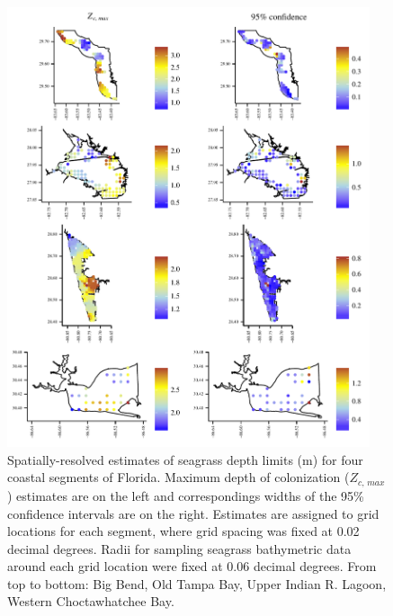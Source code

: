 \documentclass[letterpaper,12pt,oneside]{article}\usepackage[]{graphicx}\usepackage[]{color}
\begin{document}
\begin{figure}
\centering
\includegraphics[width = 0.95\textwidth]{figs/all_ests.pdf}
\caption{Spatially-resolved estimates of seagrass depth limits (m) for four coastal segments of Florida. Maximum depth of colonization ($Z_{c,\,max}$) estimates are on the left and correspondings widths of the 95\% confidence intervals are on the right.  Estimates are assigned to grid locations for each segment, where grid spacing was fixed at 0.02 decimal degrees.  Radii for sampling seagrass bathymetric data around each grid location were fixed at 0.06 decimal degrees. From top to bottom: Big Bend, Old Tampa Bay, Upper Indian R. Lagoon, Western Choctawhatchee Bay.}
\label{fig:all_ests}
\end{figure}

\end{document}
